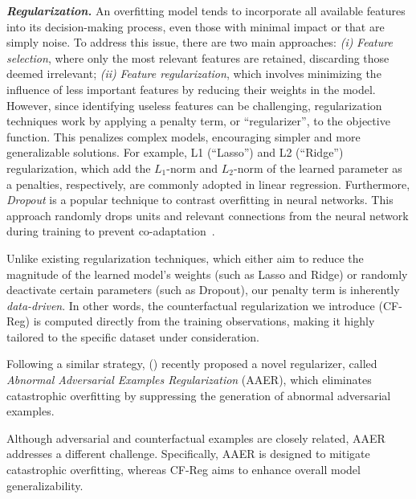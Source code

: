 \smallskip
\noindent \textit{\textbf{Regularization.}} An overfitting model tends to incorporate all available features into its decision-making process, even those with minimal impact or that are simply noise. To address this issue, there are two main approaches: \textit{(i)} \textit{Feature selection}, where only the most relevant features are retained, discarding those deemed irrelevant; \textit{(ii)} \textit{Feature regularization}, which involves minimizing the influence of less important features by reducing their weights in the model.
However, since identifying useless features can be challenging, regularization techniques work by applying a penalty term, or ``regularizer'', to the objective function. This penalizes complex models, encouraging simpler and more generalizable solutions. For example, L1 (``Lasso'') and L2 (``Ridge'') regularization, which add the $L_1$-norm and $L_2$-norm of the learned parameter as a penalties, respectively, are commonly adopted in linear regression. Furthermore, \textit{Dropout} is a popular technique to contrast overfitting in neural networks. This approach randomly drops units and relevant connections from the neural network during training to prevent co-adaptation~\citep{warde-farley2014iclr}.

Unlike existing regularization techniques, which either aim to reduce the magnitude of the learned model's weights (such as Lasso and Ridge) or randomly deactivate certain parameters (such as Dropout), our penalty term is inherently \textit{data-driven}. In other words, the counterfactual regularization we introduce (CF-Reg) is computed directly from the training observations, making it highly tailored to the specific dataset under consideration.

Following a similar strategy, \citeauthor{lin2023neurips} (\citeyear{lin2023neurips}) recently proposed a novel regularizer, called \textit{Abnormal Adversarial Examples Regularization} (AAER), which eliminates catastrophic overfitting by suppressing the generation of abnormal adversarial examples. 

Although adversarial and counterfactual examples are closely related, AAER addresses a different challenge. Specifically, AAER is designed to mitigate catastrophic overfitting, whereas CF-Reg aims to enhance overall model generalizability. 

